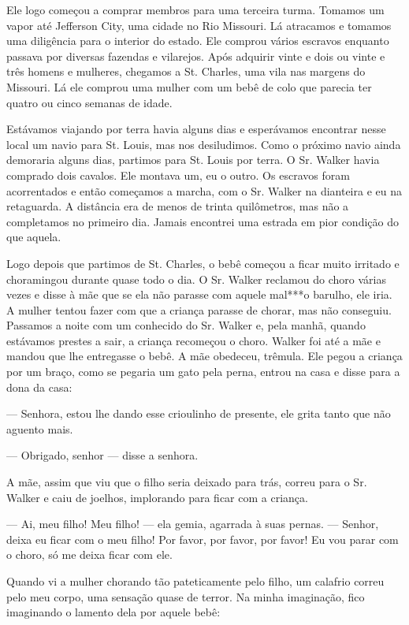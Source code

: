 Ele logo começou a comprar membros para uma terceira turma. Tomamos um
vapor até Jefferson City, uma cidade no Rio Missouri. Lá atracamos e
tomamos uma diligência para o interior do estado. Ele comprou vários
escravos enquanto passava por diversas fazendas e vilarejos. Após
adquirir vinte e dois ou vinte e três homens e mulheres, chegamos a St.
Charles, uma vila nas margens do Missouri. Lá ele comprou uma mulher com
um bebê de colo que parecia ter quatro ou cinco semanas de idade.

Estávamos viajando por terra havia alguns dias e esperávamos encontrar
nesse local um navio para St. Louis, mas nos desiludimos. Como o próximo
navio ainda demoraria alguns dias, partimos para St. Louis por terra. O
Sr. Walker havia comprado dois cavalos. Ele montava um, eu o outro. Os
escravos foram acorrentados e então começamos a marcha, com o Sr. Walker
na dianteira e eu na retaguarda. A distância era de menos de trinta
quilômetros, mas não a completamos no primeiro dia. Jamais encontrei uma
estrada em pior condição do que aquela.

Logo depois que partimos de St. Charles, o bebê começou a ficar muito
irritado e choramingou durante quase todo o dia. O Sr. Walker reclamou
do choro várias vezes e disse à mãe que se ela não parasse com aquele
mal***o barulho, ele iria. A mulher tentou fazer com que a criança
parasse de chorar, mas não conseguiu. Passamos a noite com um conhecido
do Sr. Walker e, pela manhã, quando estávamos prestes a sair, a criança
recomeçou o choro. Walker foi até a mãe e mandou que lhe entregasse o
bebê. A mãe obedeceu, trêmula. Ele pegou a criança por um braço, como se
pegaria um gato pela perna, entrou na casa e disse para a dona da casa: \label{ref9}

--- Senhora, estou lhe dando esse crioulinho de presente, ele grita
tanto que não aguento mais.

--- Obrigado, senhor --- disse a senhora.

A mãe, assim que viu que o filho seria deixado para trás, correu para o
Sr. Walker e caiu de joelhos, implorando para ficar com a criança.

--- Ai, meu filho! Meu filho! --- ela gemia, agarrada à suas pernas. ---
Senhor, deixa eu ficar com o meu filho! Por favor, por favor, por favor!
Eu vou parar com o choro, só me deixa ficar com ele.

Quando vi a mulher chorando tão pateticamente pelo filho, um calafrio
correu pelo meu corpo, uma sensação quase de terror. Na minha
imaginação, fico imaginando o lamento dela por aquele bebê:

